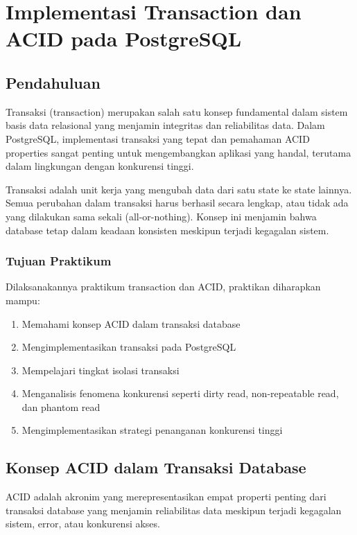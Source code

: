 \chapter*{Implementasi Transaction dan ACID pada PostgreSQL}
\section{Pendahuluan}
Transaksi (transaction) merupakan salah satu konsep fundamental dalam sistem basis data relasional yang menjamin integritas dan reliabilitas data. Dalam PostgreSQL, implementasi transaksi yang tepat dan pemahaman ACID properties sangat penting untuk mengembangkan aplikasi yang handal, terutama dalam lingkungan dengan konkurensi tinggi.

Transaksi adalah unit kerja yang mengubah data dari satu state ke state lainnya. Semua perubahan dalam transaksi harus berhasil secara lengkap, atau tidak ada yang dilakukan sama sekali (all-or-nothing). Konsep ini menjamin bahwa database tetap dalam keadaan konsisten meskipun terjadi kegagalan sistem.

\subsection{Tujuan Praktikum}
Dilaksanakannya praktikum transaction dan ACID, praktikan diharapkan mampu:
\begin{enumerate}
    \item Memahami konsep ACID dalam transaksi database
    \item Mengimplementasikan transaksi pada PostgreSQL
    \item Mempelajari tingkat isolasi transaksi
    \item Menganalisis fenomena konkurensi seperti dirty read, non-repeatable read, dan phantom read
    \item Mengimplementasikan strategi penanganan konkurensi tinggi
\end{enumerate}

\section{Konsep ACID dalam Transaksi Database}

ACID adalah akronim yang merepresentasikan empat properti penting dari transaksi database yang menjamin reliabilitas data meskipun terjadi kegagalan sistem, error, atau konkurensi akses.

